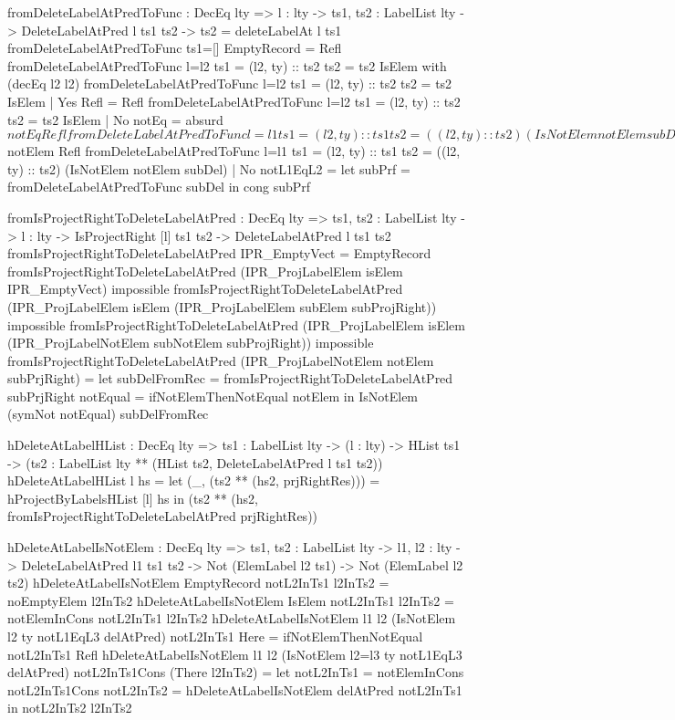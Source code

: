 \begin{code}
fromDeleteLabelAtPredToFunc : DecEq lty => {l : lty} -> 
  {ts1, ts2 : LabelList lty} -> 
  DeleteLabelAtPred l ts1 ts2 -> ts2 = deleteLabelAt l ts1
fromDeleteLabelAtPredToFunc {ts1=[]} EmptyRecord = Refl
fromDeleteLabelAtPredToFunc {l=l2} {ts1 = (l2, ty) :: ts2} 
  {ts2 = ts2} IsElem with (decEq l2 l2)
  fromDeleteLabelAtPredToFunc {l=l2} {ts1 = (l2, ty) :: ts2} 
    {ts2 = ts2} IsElem | Yes Refl = Refl
  fromDeleteLabelAtPredToFunc {l=l2} {ts1 = (l2, ty) :: ts2} 
    {ts2 = ts2} IsElem | No notEq = absurd $ notEq Refl
fromDeleteLabelAtPredToFunc {l=l1} {ts1 = (l2, ty) :: ts1} 
    {ts2 = ((l2, ty) :: ts2)} (IsNotElem notElem subDel) 
    with (decEq l1 l2)
  fromDeleteLabelAtPredToFunc {l=l1} {ts1 = (l1, ty) :: ts1} 
    {ts2 = ((l1, ty) :: ts2)} (IsNotElem notElem subDel) | 
    Yes Refl = 
    absurd $ notElem Refl
  fromDeleteLabelAtPredToFunc {l=l1} {ts1 = (l2, ty) :: ts1} 
    {ts2 = ((l2, ty) :: ts2)} (IsNotElem notElem subDel) | 
    No notL1EqL2 = 
    let subPrf = fromDeleteLabelAtPredToFunc subDel
    in cong subPrf
    
fromIsProjectRightToDeleteLabelAtPred : DecEq lty => 
  {ts1, ts2 : LabelList lty} -> {l : lty} -> 
  IsProjectRight [l] ts1 ts2 -> DeleteLabelAtPred l ts1 ts2
fromIsProjectRightToDeleteLabelAtPred IPR_EmptyVect = EmptyRecord
fromIsProjectRightToDeleteLabelAtPred 
  (IPR_ProjLabelElem isElem IPR_EmptyVect) impossible
fromIsProjectRightToDeleteLabelAtPred 
  (IPR_ProjLabelElem isElem 
    (IPR_ProjLabelElem subElem subProjRight)) impossible
fromIsProjectRightToDeleteLabelAtPred 
  (IPR_ProjLabelElem isElem 
    (IPR_ProjLabelNotElem subNotElem subProjRight)) impossible
fromIsProjectRightToDeleteLabelAtPred 
  (IPR_ProjLabelNotElem notElem subPrjRight) = 
  let subDelFromRec = 
        fromIsProjectRightToDeleteLabelAtPred subPrjRight
      notEqual = ifNotElemThenNotEqual notElem
  in IsNotElem (symNot notEqual) subDelFromRec
    
        
hDeleteAtLabelHList : DecEq lty => {ts1 : LabelList lty} -> 
  (l : lty) -> HList ts1 ->
  (ts2 : LabelList lty ** (HList ts2, DeleteLabelAtPred l ts1 ts2))
hDeleteAtLabelHList l hs =
  let (_, (ts2 ** (hs2, prjRightRes))) = hProjectByLabelsHList [l] hs
  in (ts2 ** 
    (hs2, fromIsProjectRightToDeleteLabelAtPred prjRightRes))
  
hDeleteAtLabelIsNotElem : DecEq lty => {ts1, ts2 : LabelList lty} -> 
  {l1, l2 : lty} -> DeleteLabelAtPred l1 ts1 ts2 -> 
  Not (ElemLabel l2 ts1) -> Not (ElemLabel l2 ts2)  
hDeleteAtLabelIsNotElem EmptyRecord notL2InTs1 l2InTs2 = 
  noEmptyElem l2InTs2
hDeleteAtLabelIsNotElem IsElem notL2InTs1 l2InTs2 = 
  notElemInCons notL2InTs1 l2InTs2
hDeleteAtLabelIsNotElem {l1} {l2} 
  (IsNotElem {l2} {ty} notL1EqL3 delAtPred) notL2InTs1 Here = 
  ifNotElemThenNotEqual notL2InTs1 Refl
hDeleteAtLabelIsNotElem {l1} {l2} 
  (IsNotElem {l2=l3} {ty} notL1EqL3 delAtPred) notL2InTs1Cons 
  (There l2InTs2) = 
  let notL2InTs1 = notElemInCons notL2InTs1Cons
      notL2InTs2  = hDeleteAtLabelIsNotElem delAtPred notL2InTs1
  in notL2InTs2 l2InTs2
  

\end{code}

